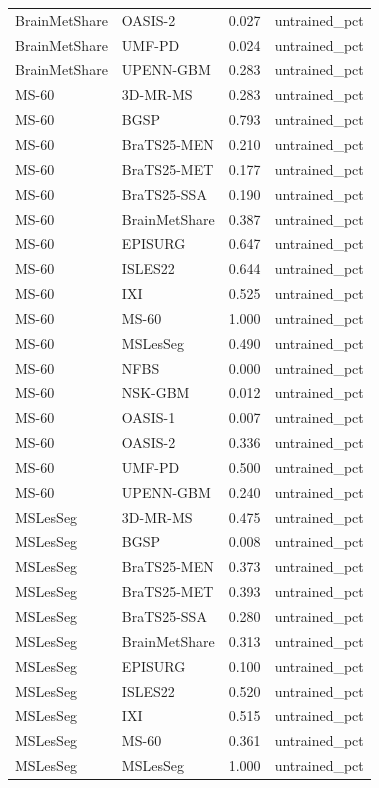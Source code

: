 \begin{tabular}{llrl}
BrainMetShare & OASIS-2 & 0.027 & untrained\_pct \\
BrainMetShare & UMF-PD & 0.024 & untrained\_pct \\
BrainMetShare & UPENN-GBM & 0.283 & untrained\_pct \\
MS-60 & 3D-MR-MS & 0.283 & untrained\_pct \\
MS-60 & BGSP & 0.793 & untrained\_pct \\
MS-60 & BraTS25-MEN & 0.210 & untrained\_pct \\
MS-60 & BraTS25-MET & 0.177 & untrained\_pct \\
MS-60 & BraTS25-SSA & 0.190 & untrained\_pct \\
MS-60 & BrainMetShare & 0.387 & untrained\_pct \\
MS-60 & EPISURG & 0.647 & untrained\_pct \\
MS-60 & ISLES22 & 0.644 & untrained\_pct \\
MS-60 & IXI & 0.525 & untrained\_pct \\
MS-60 & MS-60 & 1.000 & untrained\_pct \\
MS-60 & MSLesSeg & 0.490 & untrained\_pct \\
MS-60 & NFBS & 0.000 & untrained\_pct \\
MS-60 & NSK-GBM & 0.012 & untrained\_pct \\
MS-60 & OASIS-1 & 0.007 & untrained\_pct \\
MS-60 & OASIS-2 & 0.336 & untrained\_pct \\
MS-60 & UMF-PD & 0.500 & untrained\_pct \\
MS-60 & UPENN-GBM & 0.240 & untrained\_pct \\
MSLesSeg & 3D-MR-MS & 0.475 & untrained\_pct \\
MSLesSeg & BGSP & 0.008 & untrained\_pct \\
MSLesSeg & BraTS25-MEN & 0.373 & untrained\_pct \\
MSLesSeg & BraTS25-MET & 0.393 & untrained\_pct \\
MSLesSeg & BraTS25-SSA & 0.280 & untrained\_pct \\
MSLesSeg & BrainMetShare & 0.313 & untrained\_pct \\
MSLesSeg & EPISURG & 0.100 & untrained\_pct \\
MSLesSeg & ISLES22 & 0.520 & untrained\_pct \\
MSLesSeg & IXI & 0.515 & untrained\_pct \\
MSLesSeg & MS-60 & 0.361 & untrained\_pct \\
MSLesSeg & MSLesSeg & 1.000 & untrained\_pct \\

\end{tabular}
